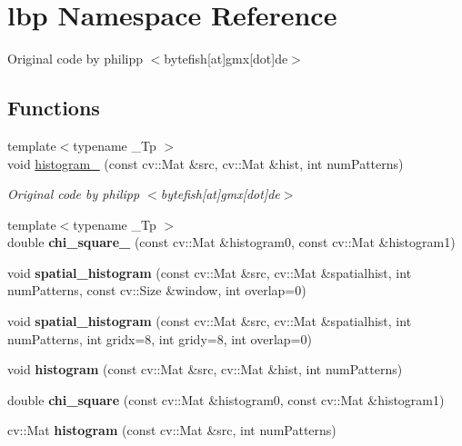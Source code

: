 \section{lbp Namespace Reference}
\label{namespacelbp}


Original code by philipp $<$bytefish\mbox{[}at\mbox{]}gmx\mbox{[}dot\mbox{]}de$>$  


\subsection*{Functions}
\begin{DoxyCompactItemize}
\item 
{\footnotesize template$<$typename \+\_\+\+Tp $>$ }\\void \mbox{\hyperlink{namespacelbp_a7a2d45fdc785282bc110d25495ef78d7}{histogram\+\_\+}} (const cv\+::\+Mat \&src, cv\+::\+Mat \&hist, int num\+Patterns)
\begin{DoxyCompactList}\small\item\em Original code by philipp $<$bytefish\mbox{[}at\mbox{]}gmx\mbox{[}dot\mbox{]}de$>$ \end{DoxyCompactList}\item 
\mbox{\label{namespacelbp_a7f6233ae8ce09653d048465413e5a40f}} 
{\footnotesize template$<$typename \+\_\+\+Tp $>$ }\\double {\bfseries chi\+\_\+square\+\_\+} (const cv\+::\+Mat \&histogram0, const cv\+::\+Mat \&histogram1)
\item 
\mbox{\label{namespacelbp_a033b381259dbac1e636bf1729abd0d84}} 
void {\bfseries spatial\+\_\+histogram} (const cv\+::\+Mat \&src, cv\+::\+Mat \&spatialhist, int num\+Patterns, const cv\+::\+Size \&window, int overlap=0)
\item 
\mbox{\label{namespacelbp_afe088914321c9c6210cdb611aa6c2fa9}} 
void {\bfseries spatial\+\_\+histogram} (const cv\+::\+Mat \&src, cv\+::\+Mat \&spatialhist, int num\+Patterns, int gridx=8, int gridy=8, int overlap=0)
\item 
\mbox{\label{namespacelbp_a1ec08379651e945f526ee485960feb55}} 
void {\bfseries histogram} (const cv\+::\+Mat \&src, cv\+::\+Mat \&hist, int num\+Patterns)
\item 
\mbox{\label{namespacelbp_abc2c2aedd18a2a6edd9c128c843bb572}} 
double {\bfseries chi\+\_\+square} (const cv\+::\+Mat \&histogram0, const cv\+::\+Mat \&histogram1)
\item 
\mbox{\label{namespacelbp_ab84f853b680a693ba42f63e32cdbb7b6}} 
cv\+::\+Mat {\bfseries histogram} (const cv\+::\+Mat \&src, int num\+Patterns)

\end{DoxyCompactItemize}
